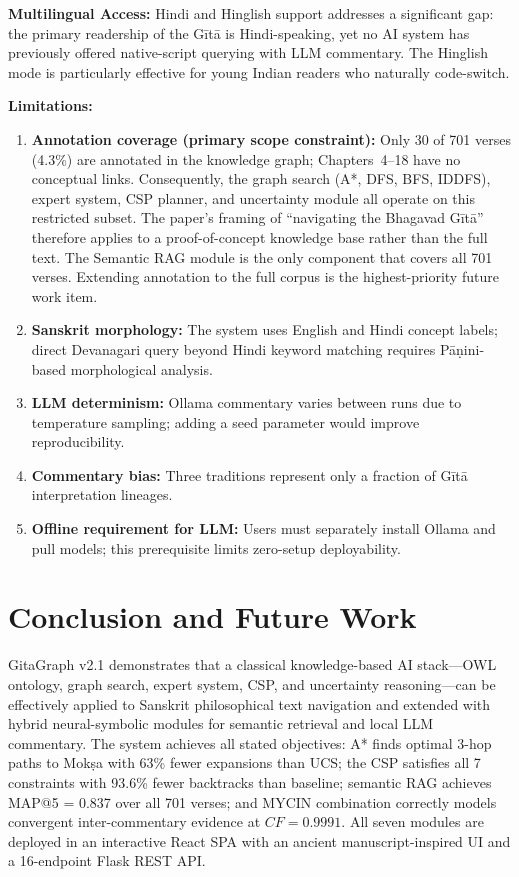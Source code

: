 \documentclass[conference]{IEEEtran}
\begin{document}
\textbf{Multilingual Access:} Hindi and Hinglish support addresses a significant
gap: the primary readership of the G\={i}t\={a} is Hindi-speaking, yet no AI system
has previously offered native-script querying with LLM commentary. The Hinglish
mode is particularly effective for young Indian readers who naturally code-switch.

\textbf{Limitations:}
\begin{enumerate}[leftmargin=*]
  \item \textbf{Annotation coverage (primary scope constraint):} Only 30 of 701
        verses (4.3\%) are annotated in the knowledge graph; Chapters~4--18 have
        no conceptual links. Consequently, the graph search (A*, DFS, BFS, IDDFS),
        expert system, CSP planner, and uncertainty module all operate on this
        restricted subset. The paper's framing of ``navigating the Bhagavad
        G\={i}t\={a}'' therefore applies to a proof-of-concept knowledge base rather
        than the full text. The Semantic RAG module is the only component that covers
        all 701 verses. Extending annotation to the full corpus is the highest-priority
        future work item.
  \item \textbf{Sanskrit morphology:} The system uses English and Hindi concept labels;
        direct Devanagari query beyond Hindi keyword matching requires P\={a}{\d{n}}ini-based
        morphological analysis.
  \item \textbf{LLM determinism:} Ollama commentary varies between runs due to
        temperature sampling; adding a seed parameter would improve reproducibility.
  \item \textbf{Commentary bias:} Three traditions represent only a fraction of
        G\={i}t\={a} interpretation lineages.
  \item \textbf{Offline requirement for LLM:} Users must separately install Ollama
        and pull models; this prerequisite limits zero-setup deployability.
\end{enumerate}

\clearpage
\section{Conclusion and Future Work}

GitaGraph v2.1 demonstrates that a classical knowledge-based AI stack—OWL
ontology, graph search, expert system, CSP, and uncertainty reasoning—can be
effectively applied to Sanskrit philosophical text navigation and extended with
hybrid neural-symbolic modules for semantic retrieval and local LLM commentary.
The system achieves all stated objectives: A* finds optimal 3-hop paths to
Mok\d{s}a with 63\% fewer expansions than UCS; the CSP satisfies all 7 constraints
with 93.6\% fewer backtracks than baseline; semantic RAG achieves MAP@5 = 0.837
over all 701 verses; and MYCIN combination correctly models convergent
inter-commentary evidence at $CF = 0.9991$. All seven modules are deployed in
an interactive React SPA with an ancient manuscript-inspired UI and a
16-endpoint Flask REST API.
\end{document}
